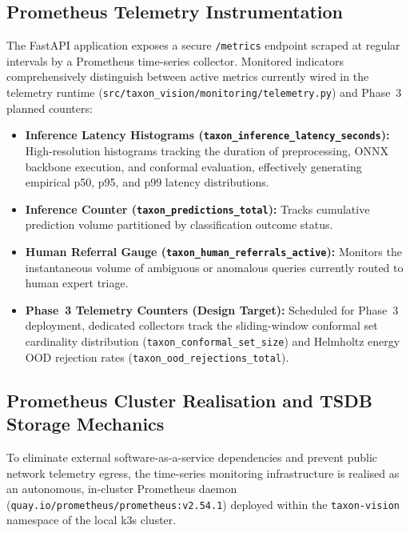 \subsection{Prometheus Telemetry Instrumentation}
The FastAPI application exposes a secure \texttt{/metrics} endpoint scraped at regular intervals by a Prometheus time-series collector. Monitored indicators comprehensively distinguish between active metrics currently wired in the telemetry runtime (\texttt{src/taxon\_vision/monitoring/telemetry.py}) and Phase~3 planned counters:
\begin{itemize}
    \item \textbf{Inference Latency Histograms (\texttt{taxon\_inference\_latency\_seconds}):} High-resolution histograms tracking the duration of preprocessing, ONNX backbone execution, and conformal evaluation, effectively generating empirical p50, p95, and p99 latency distributions.
    \item \textbf{Inference Counter (\texttt{taxon\_predictions\_total}):} Tracks cumulative prediction volume partitioned by classification outcome status.
    \item \textbf{Human Referral Gauge (\texttt{taxon\_human\_referrals\_active}):} Monitors the instantaneous volume of ambiguous or anomalous queries currently routed to human expert triage.
    \item \textbf{Phase~3 Telemetry Counters (Design Target):} Scheduled for Phase~3 deployment, dedicated collectors track the sliding-window conformal set cardinality distribution (\texttt{taxon\_\allowbreak conformal\_\allowbreak set\_\allowbreak size}) and Helmholtz energy OOD rejection rates (\texttt{taxon\_\allowbreak ood\_\allowbreak rejections\_\allowbreak total}).
\end{itemize}

\subsection{Prometheus Cluster Realisation and TSDB Storage Mechanics}
\label{sec:prometheus_tsdb_realisation}

To eliminate external software-as-a-service dependencies and prevent public network telemetry egress, the time-series monitoring infrastructure is realised as an autonomous, in-cluster Prometheus daemon (\nolinkurl{quay.io/prometheus/prometheus:v2.54.1}) deployed within the \texttt{taxon-vision} namespace of the local k3s cluster.

